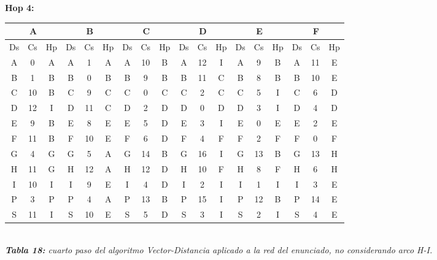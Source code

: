 \documentclass[letterpaper,10pt,onecolumn,titlepage]{article}
\begin{document}
 \newpage
 
\textbf{Hop 4:}
 \begin{center}
   \begin{tabular}{|c|c|c|c|c|c|c|c|c|c|c|c|c|c|c|c|c|c|} \hline
     \multicolumn{3}{|c|}{A} & \multicolumn{3}{|c|}{B} & \multicolumn{3}{|c|}{C} & \multicolumn{3}{|c|}{D} & \multicolumn{3}{|c|}{E} & \multicolumn{3}{|c|}{F} \\ \hline
     Ds & Cs & Hp & Ds & Cs & Hp & Ds & Cs & Hp & Ds & Cs & Hp & Ds & Cs & Hp & Ds & Cs & Hp \\ \hline
     A  & 0  & A  & A  & 1  & A  & A  & 10  & B  & A  & 12  & I  & A  & 9  & B  & A  & 11  & E \\ \hline
     B  & 1  & B  & B  & 0  & B  & B  & 9  & B  & B  & 11  & C  & B  & 8  & B & B  & 10  & E \\ \hline
     C  & 10  & B  & C  & 9  & C  & C  & 0  & C  & C  & 2  & C  & C  & 5  & I  & C  & 6  & D \\ \hline
     D  & 12  & I  & D  & 11  & C & D  & 2  & D  & D  & 0  & D  & D  & 3  & I  & D  & 4  & D \\ \hline
     E  & 9  & B  & E  & 8  & E  & E  & 5  & D  & E  & 3  & I  & E  & 0  & E  & E  & 2  & E \\ \hline
     F  & 11  & B  & F  & 10  & E  & F  & 6  & D  & F  & 4  & F  & F  & 2  & F  & F  & 0  & F \\ \hline
     G  & 4  & G  & G  & 5  & A  & G  & 14  & B  & G  & 16  & I  & G  & 13  & B  & G  & 13  & H \\ \hline
     H  & 11  & G  & H  & 12  & A  & H  & 12  & D  & H  & 10  & F  & H  & 8  & F  & H  & 6  & H \\ \hline
     I  & 10  & I  & I  & 9  & E  & I  & 4  & D  & I  & 2  & I  & I  & 1  & I  & I  & 3  & E \\ \hline
     P  & 3  & P  & P  & 4  & A  & P  & 13  & B  & P  & 15  & I  & P  & 12  & B  & P  & \color{red}14  & \color{red}E \\ \hline
     S  & 11  & I  & S  & 10  & E  & S  & 5  & D  & S  & 3  & I  & S  & 2  & I  & S  & 4  & E \\ \hline
   \end{tabular}\\
   \textit{\textbf{Tabla 18:} cuarto paso del algoritmo Vector-Distancia aplicado a la red del enunciado, no considerando arco H-I.}
 \end{center}
 
\end{document}
